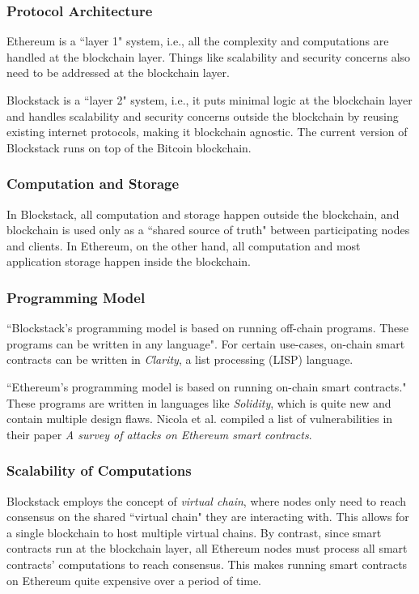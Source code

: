 			\subsubsection{Protocol Architecture}
			Ethereum is a ``layer 1" system, i.e., all the complexity and computations are handled at the blockchain layer. Things like scalability and security concerns also need to be addressed at the blockchain layer. 
			
			Blockstack is a ``layer 2" system, i.e., it puts minimal logic at the blockchain layer and handles scalability and security concerns outside the blockchain by reusing existing internet protocols, making it blockchain agnostic. The current version of Blockstack runs on top of the Bitcoin blockchain.
			
			\subsubsection{Computation and Storage}
			In Blockstack, all computation and storage happen outside the blockchain, and blockchain is used only as a ``shared source of truth" between participating nodes and clients. In Ethereum, on the other hand, all computation and most application storage happen inside the blockchain.
			
			\subsubsection{Programming Model}
			``Blockstack's programming model is based on running off-chain programs. These programs can be written in any language". For certain use-cases, on-chain smart contracts can be written in \textit{Clarity}\cite{doc:clarity:2}, a list processing (LISP) language.
			
			``Ethereum's programming model is based on running on-chain smart contracts." These programs are written in languages like \textit{Solidity}\cite{github:solidity:1}, which is quite new and contain multiple design flaws. Nicola et al. compiled a list of vulnerabilities in their paper \textit{A survey of attacks on Ethereum smart contracts}\cite{atzei2016survey}.
			
			\subsubsection{Scalability of Computations}
			Blockstack employs the concept of \textit{virtual chain}\cite{nelson2016extending}, where nodes only need to reach consensus on the shared ``virtual chain" they are interacting with. This allows for a single blockchain to host multiple virtual chains. By contrast, since smart contracts run at the blockchain layer, all Ethereum nodes must process all smart contracts' computations to reach consensus. This makes running smart contracts on Ethereum quite expensive over a period of time.
			
